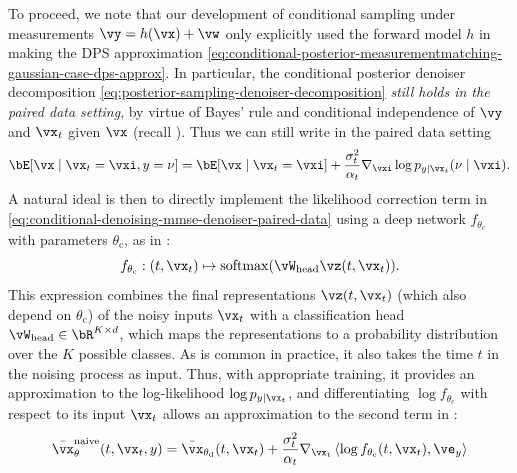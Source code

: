 \documentclass[../../book-main.tex]{subfiles}
\begin{document}
To proceed, we note that our development of conditional sampling under
measurements $\vy = h(\vx) + \vw$ only explicitly used the
forward model $h$ in making the DPS approximation
\eqref{eq:conditional-posterior-measurementmatching-gaussian-case-dps-approx}.
In particular, the conditional posterior denoiser decomposition
\eqref{eq:posterior-sampling-denoiser-decomposition} \textit{still holds in the
paired data setting}, by virtue of Bayes' rule
and conditional independence of $\vy$ and $\vx_t$ given $\vx$ (recall
). Thus we can still write in the paired
data setting
\begin{equation}\label{eq:conditional-denoising-mmse-denoiser-paired-data}
  \bE[ \vx \mid \vx_t=\vxi, y=\nu]
  =
  \bE[\vx \mid \vx_t=\vxi] 
  + \frac{\sigma_t^2}{\alpha_t} 
  \nabla_{\vxi}\log p_{y \mid \vx_t}(\nu\mid \vxi).
\end{equation}
A natural ideal is then to directly implement the likelihood correction term in
\eqref{eq:conditional-denoising-mmse-denoiser-paired-data} using a deep network
$f_{\theta_{\mathrm{c}}}$ with parameters $\theta_{\mathrm{c}}$, as in
: 
\begin{equation}
  f_{\theta_{\mathrm{c}}} : (t, \vx_t) \mapsto \softmax(\vW_{\mathrm{head}}
  \vz(t, \vx_t)).
\end{equation}
This expression combines the final representations $\vz(t, \vx_t)$ (which also depend on
$\theta_{\mathrm{c}}$) of the noisy inputs
$\vx_t$ with a classification head $\vW_{\mathrm{head}} \in \bR^{K \times d}$, which maps the
representations to a probability distribution over the $K$ possible classes.
As is common in practice, it also takes the time $t$ in the noising process as
input.
Thus, with appropriate training, it provides an approximation to the log-likelihood
$\log p_{y \mid \vx_t}$, and differentiating $\log f_{\theta_{\mathrm{c}}}$ with
respect to its input $\vx_t$
allows an approximation to the second term in
:
\begin{equation}\label{eq:conditional-denoising-mmse-denoiser-paired-data-approx}
  \bar{\vx}_{\theta}^{\mathrm{naive}}(t, \vx_t, y)
  =
  \bar{\vx}_{\theta_{\mathrm{d}}}(t, \vx_t)
  + \frac{\sigma_t^2}{\alpha_t}
  \nabla_{\vx_t}
  \ip*{
    \log f_{\theta_{\mathrm{c}}}(t, \vx_t)
  }{
    \ve_{y}
  }
\end{equation}
\end{document}
